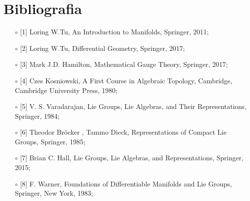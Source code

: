 \documentclass[12pt,a4paper]{report}
\theoremstyle{definition}
\theoremstyle{Theorem}
\theoremstyle{definition}
\theoremstyle{definition}
\begin{document}
	\chapter*{Bibliografia}
	\begin{itemize}
		\item[$\circ$] [1] Loring W.Tu, An Introduction to Manifolds, Springer, 2011;
		\item[$\circ$] [2] Loring W.Tu, Differential Geometry, Springer, 2017;
		\item[$\circ$] [3] Mark J.D. Hamilton, Mathematical Gauge Theory, Springer, 2017;
		\item[$\circ$] [4] Czes Kosniowski, A First Course in Algebraic Topology, Cambridge, Cambridge University Press, 1980;
		\item[$\circ$] [5] V. S. Varadarajan, Lie Groups, Lie Algebras, and Their Representations, Springer, 1984;
		\item[$\circ$] [6] Theodor Bröcker , Tammo Dieck, Representations of Compact Lie Groups, Springer, 1985;
		\item[$\circ$] [7] Brian C. Hall, Lie Groups, Lie Algebras, and Representations, Springer, 2015;
		\item[$\circ$] [8] F. Warner, Foundations of Differentiable Manifolds and Lie Groups, Springer, New York, 1983;
	\end{itemize}
	
\end{document}
